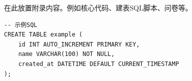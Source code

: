 

在此放置附录内容。例如核心代码、建表SQL脚本、问卷等。

\begin{verbatim}
-- 示例SQL
CREATE TABLE example (
    id INT AUTO_INCREMENT PRIMARY KEY,
    name VARCHAR(100) NOT NULL,
    created_at DATETIME DEFAULT CURRENT_TIMESTAMP
);
\end{verbatim}

